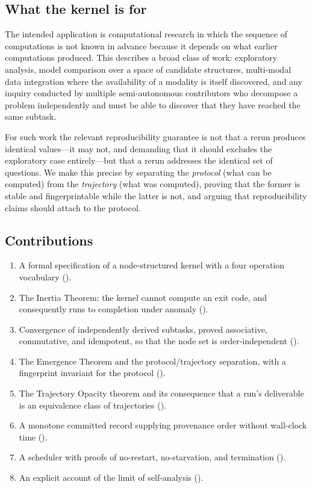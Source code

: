 \documentclass[11pt,a4paper]{article}
\theoremstyle{thmstyle}
\theoremstyle{definition}
\theoremstyle{remark}
\begin{document}
\subsection{What the kernel is for}

The intended application is computational research in which the sequence of
computations is not known in advance because it depends on what earlier
computations produced. This describes a broad class of work: exploratory
analysis, model comparison over a space of candidate structures,
multi-modal data integration where the availability of a modality is itself
discovered, and any inquiry conducted by multiple semi-autonomous
contributors who decompose a problem independently and must be able to
discover that they have reached the same subtask.

For such work the relevant reproducibility guarantee is not that a rerun
produces identical values---it may not, and demanding that it should
excludes the exploratory case entirely---but that a rerun addresses the
identical set of questions. We make this precise by separating the
\emph{protocol} (what can be computed) from the \emph{trajectory} (what was
computed), proving that the former is stable and fingerprintable while the
latter is not, and arguing that reproducibility claims should attach to the
protocol.

\subsection{Contributions}

\begin{enumerate}[leftmargin=1.5em]
\item A formal specification of a node-structured kernel with a four
operation vocabulary ().
\item The Inertia Theorem: the kernel cannot compute an exit code, and
consequently runs to completion under anomaly
().
\item Convergence of independently derived subtasks, proved associative,
commutative, and idempotent, so that the node set is order-independent
().
\item The Emergence Theorem and the protocol/trajectory separation, with a
fingerprint invariant for the protocol ().
\item The Trajectory Opacity theorem and its consequence that a run's
deliverable is an equivalence class of trajectories
().
\item A monotone committed record supplying provenance order without
wall-clock time ().
\item A scheduler with proofs of no-restart, no-starvation, and termination
().
\item An explicit account of the limit of self-analysis
().
\end{enumerate}
\end{document}
